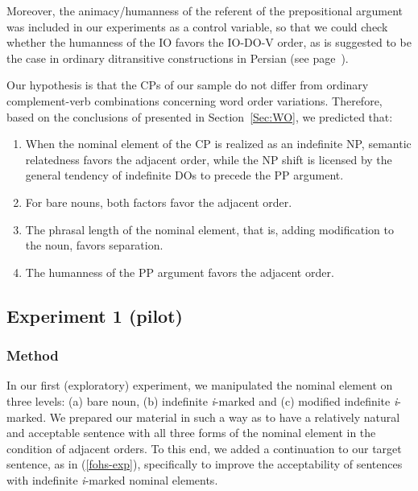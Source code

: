 \documentclass[output=paper]{langsci/langscibook}
\begin{document}
\begin{exe}
	\ex\label{vakszdn}
	\begin{xlist}
	\end{xlist}
\end{exe}

\begin{sloppypar}
  Moreover, the animacy/humanness of the referent of the prepositional
  argument was included in our experiments as a control variable, so
  that we could check whether the humanness of the IO favors the
  IO-DO-V order, as is suggested to be the case in ordinary
  ditransitive constructions in Persian (see
  page~\pageref{ListWOClaims}).
\end{sloppypar}
\begin{sloppypar}
  Our hypothesis is that the CPs of our sample do not differ from
  ordinary complement-verb combinations concerning word order
  variations. Therefore, based on the conclusions of
  \citet{FaghiriPhd} presented in Section~\ref{Sec:WO}, we predicted
  that:
\end{sloppypar}
\begin{enumerate}
	\item When the nominal element of the CP is realized as an indefinite NP, semantic relatedness favors the adjacent order, while the NP shift is licensed by the general tendency of indefinite DOs to precede the PP argument. 
	\item For bare nouns, both factors favor the adjacent order. 
	\item The phrasal length of the nominal element, that is, adding modification to the noun, favors separation.
	\item The humanness of the PP argument favors the adjacent order. 
\end{enumerate}

\subsection{Experiment 1 (pilot)}
\subsubsection{Method}
In our first (exploratory) experiment, we manipulated the nominal element on three levels: (a) bare noun, (b) indefinite \textit{i}-marked and (c) modified indefinite \textit{i}-marked. We prepared our material in such a way as to have a relatively natural and acceptable sentence  with all three forms of the nominal element in the condition of adjacent orders. To this end, we added a continuation to our target sentence, as in (\ref{fohs-exp}), specifically to improve the acceptability of sentences with indefinite \textit{i}-marked nominal elements.
\end{document}
